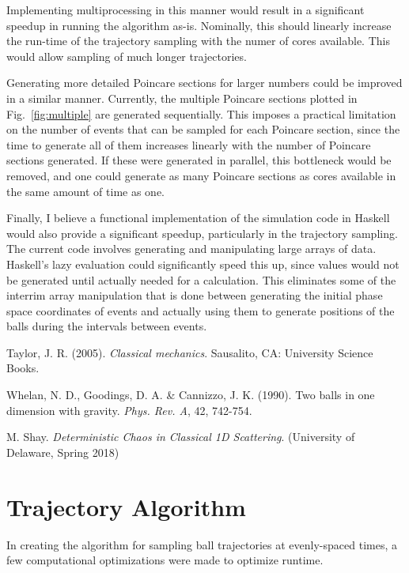 \documentclass[pra,twocolumn,showpacs,amsmath,amssymb, aps, 10pt]{revtex4-1}
\begin{document}
Implementing multiprocessing in this manner would result in a significant
speedup in running the algorithm as-is. Nominally, this should linearly increase
the run-time of the trajectory sampling with the numer of cores available. This
would allow sampling of much longer trajectories.

Generating more detailed Poincare sections for larger numbers could be improved
in a similar manner. Currently, the multiple Poincare sections plotted in
Fig.~\ref{fig:multiple} are generated sequentially. This imposes a practical
limitation on the number of events that can be sampled for each Poincare section,
since the time to generate all of them increases linearly with the number of Poincare
sections generated. If these were generated in parallel, this bottleneck would be
removed, and one could generate as many Poincare sections as cores available in
the same amount of time as one.

Finally, I believe a functional implementation of the simulation code in Haskell
would also provide a significant speedup, particularly in the trajectory sampling.
The current code involves generating and manipulating large arrays of data.
Haskell's lazy evaluation could significantly speed this up, since values would
not be generated until actually needed for a calculation. This eliminates some
of the interrim array manipulation that is done between generating the initial
phase space coordinates of events and actually using them to generate positions
of the balls during the intervals between events.



\FloatBarrier
\begin{thebibliography}{1}
  Taylor, J. R. (2005).
  \textit{Classical mechanics}.
  Sausalito, CA: University Science Books.

Whelan, N. D., Goodings, D. A. \& Cannizzo, J. K. (1990).
Two balls in one dimension with gravity.
\textit{Phys. Rev. A}, 42, 742-754.


M. Shay.
\textit{Deterministic Chaos in Classical 1D Scattering}.
(University of Delaware, Spring 2018)

\end{thebibliography}

\clearpage
\appendix
\section{Trajectory Algorithm}\label{appendix:traj}
In creating the algorithm for sampling ball trajectories at evenly-spaced times,
a few computational optimizations were made to optimize runtime.
\end{document}
